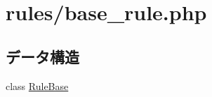 \hypertarget{base__rule_8php}{
\section{rules/base\-\_\-rule.php}
\label{base__rule_8php}
}
\subsection*{データ構造}
\begin{DoxyCompactItemize}
\item 
class \hyperlink{class_rule_base}{\-Rule\-Base}
\end{DoxyCompactItemize}
